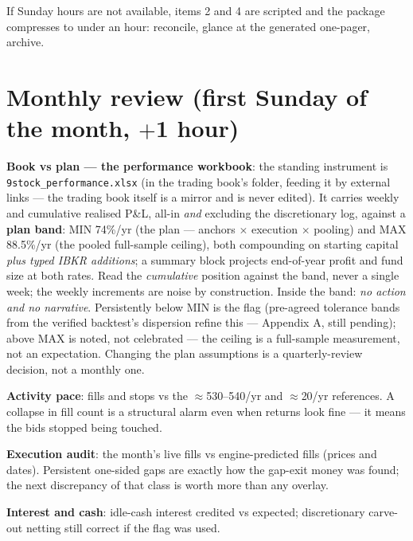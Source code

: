 \documentclass[11pt,a4paper]{article}
\begin{document}
If Sunday hours are not available, items 2 and 4 are scripted and the
package compresses to under an hour: reconcile, glance at the generated
one-pager, archive.

\section{Monthly review (first Sunday of the month, $+$1 hour)}

\begin{checklist}
\item \textbf{Book vs plan --- the performance workbook}: the standing
      instrument is \texttt{9stock\_performance.xlsx} (in the trading book's
      folder, feeding it by external links --- the trading book itself is a
      mirror and is never edited). It carries weekly and cumulative realised
      P\&L, all-in \emph{and} excluding the discretionary log, against a
      \textbf{plan band}: MIN 74\%/yr (the plan --- anchors $\times$
      execution $\times$ pooling) and MAX 88.5\%/yr (the pooled full-sample
      ceiling), both compounding on starting capital \emph{plus typed IBKR
      additions}; a summary block projects end-of-year profit and fund size
      at both rates. Read the \emph{cumulative} position against the band,
      never a single week; the weekly increments are noise by construction.
      Inside the band: \emph{no action and no narrative}. Persistently below
      MIN is the flag (pre-agreed tolerance bands from the verified
      backtest's dispersion refine this --- Appendix A, still pending);
      above MAX is noted, not celebrated --- the ceiling is a full-sample
      measurement, not an expectation. Changing the plan assumptions is a
      quarterly-review decision, not a monthly one.
\item \textbf{Activity pace}: fills and stops vs the $\approx$530--540/yr
      and $\approx$20/yr references. A collapse in fill count is a structural
      alarm even when returns look fine --- it means the bids stopped being
      touched.
\item \textbf{Execution audit}: the month's live fills vs engine-predicted
      fills (prices and dates). Persistent one-sided gaps are exactly how
      the gap-exit money was found; the next discrepancy of that class is
      worth more than any overlay.
\item \textbf{Interest and cash}: idle-cash interest credited vs expected;
      discretionary carve-out netting still correct if the flag was used.
\end{checklist}
\end{document}
